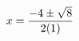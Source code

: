 \documentclass[preview]{standalone}
\begin{document}
\begin{align*}
\special{dvisvgm:raw <g id='unique000'>}x=\frac{-4\pm\sqrt{8}}{2(1)}\special{dvisvgm:raw </g>}
\end{align*}
\end{document}
